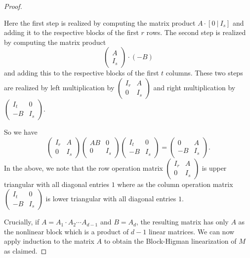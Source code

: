 \begin{proof}
\begin{itemize}
Here the first step is realized by computing the matrix product
$A\cdot [0~|~I_s]$ and adding it to the respective blocks of the first
$r$ rows. The second step is realized by computing the matrix product
\[
 \left(
\begin{array}{c}
  A \\
  I_s
\end{array}
\right)\cdot (-B)
\]
and adding this to the respective blocks of the first $t$ columns.
These two steps are realized by left multiplication by $\left(
\begin{array}{c|c}
I_r & A \\
\hline
0 & I_s
\end{array}
\right)$ and right multiplication by $\left(
\begin{array}{c|c}
I_t & 0 \\
\hline
 -B & I_s
\end{array}
\right).$
\end{itemize}
So we have
\[\left(
\begin{array}{cc}
I_r & A \\
%
0 & I_s
\end{array}
\right)
\left(
\begin{array}{cc}
AB & 0 \\
0 & I_s
\end{array}
\right)
\left(
\begin{array}{cc}
I_t & 0 \\
%
 -B & I_s
\end{array}
\right) = 
\left(
\begin{array}{cc}
0 & A \\
-B & I_s
\end{array}
\right).
\]
In the above, we note that the row operation matrix $\left(
\begin{array}{cc}
I_r & A \\
%
0 & I_s
\end{array}
\right)$ is upper triangular with all diagonal entries $1$ where as the column operation matrix $\left(
\begin{array}{cc}
I_t & 0 \\
%
 -B & I_s
\end{array}
\right)$ is lower triangular with all diagonal entries $1$. 

Crucially, if $A=A_1\cdot A_2\cdots A_{d-1}$ and $B=A_d$, the
resulting matrix has only $A$ as the nonlinear block which is a
product of $d-1$ linear matrices. We can now apply induction to
the matrix $A$ to obtain the Block-Higman linearization of $M$
as claimed. 


\end{proof}
